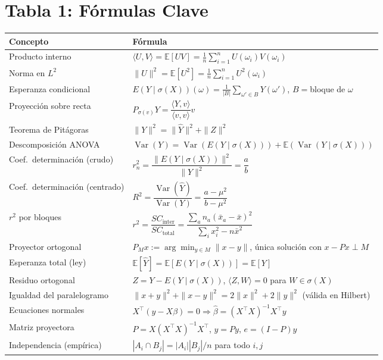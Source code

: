 \documentclass[11pt]{article}
\newcommand{\E}{\mathbb{E}}
\newcommand{\Var}{\operatorname{Var}}
\newcommand{\sg}{\sigma}
\begin{document}
\section*{Tabla 1: Fórmulas Clave}
\vspace{0.3em}
\begin{center}
\small
\begin{tabular}{@{}p{5.5cm}p{7.5cm}@{}}
\toprule
\textbf{Concepto} & \textbf{Fórmula}\\
\midrule
Producto interno & $\langle U,V\rangle=\E[UV]=\frac1n\sum_{i=1}^n U(\omega_i)V(\omega_i)$\\
Norma en $L^2$ & $\|U\|^2=\E[U^2]=\frac1n\sum_{i=1}^n U^2(\omega_i)$\\
Esperanza condicional & $E(Y\mid\sg(X))(\omega)=\frac{1}{|B|}\sum_{\omega'\in B}Y(\omega')$, $B=$bloque de $\omega$\\
Proyección sobre recta & $P_{\sg(v)}Y=\dfrac{\langle Y,v\rangle}{\langle v,v\rangle}v$\\
Teorema de Pitágoras & $\|Y\|^2=\|\hat Y\|^2+\|Z\|^2$\\
Descomposición ANOVA & $\Var(Y)=\Var(E(Y\mid\sg(X)))+\E(\Var(Y\mid\sg(X)))$\\
Coef.\ determinación (crudo) & $r_n^2=\dfrac{\|E(Y\mid\sg(X))\|^2}{\|Y\|^2}=\dfrac{a}{b}$\\
Coef.\ determinación (centrado) & $R^2=\dfrac{\Var(\hat Y)}{\Var(Y)}=\dfrac{a-\mu^2}{b-\mu^2}$\\
$r^2$ por bloques & $r^2=\dfrac{SC_\text{inter}}{SC_\text{total}}=\dfrac{\sum_a n_a(\bar x_a-\bar x)^2}{\sum_i x_i^2-n\bar x^2}$\\
Proyector ortogonal & $P_M x:=\arg\min_{y\in M}\|x-y\|$, única solución con $x-Px\perp M$\\
Esperanza total (ley) & $\E[\hat Y]=\E[E(Y\mid\sg(X))]=\E[Y]$\\
Residuo ortogonal & $Z=Y-E(Y\mid\sg(X))$, $\langle Z,W\rangle=0$ para $W\in\sg(X)$\\
Igualdad del paralelogramo & $\|x+y\|^2+\|x-y\|^2=2\|x\|^2+2\|y\|^2$ (válida en Hilbert)\\
Ecuaciones normales & $X^\top(y-X\beta)=0 \Rightarrow \hat\beta=(X^\top X)^{-1}X^\top y$\\
Matriz proyectora & $P=X(X^\top X)^{-1}X^\top$, $\hat y=Py$, $e=(I-P)y$\\
Independencia (empírica) & $|A_i\cap B_j|=|A_i||B_j|/n$ para todo $i,j$\\
\bottomrule
\end{tabular}
\end{center}
\end{document}
